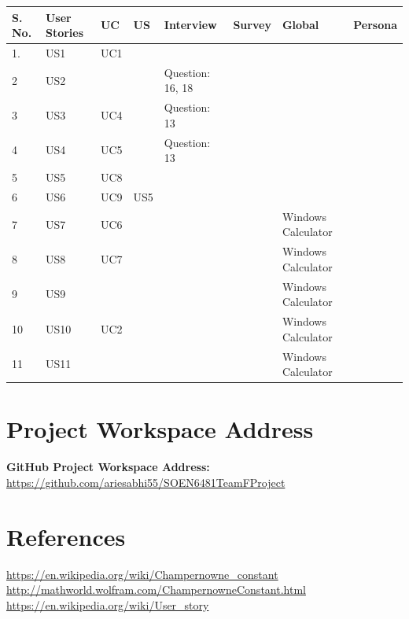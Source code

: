 \documentclass[paper=a4, fontsize=11pt]{report}
\numberwithin{equation}{section}		%
\numberwithin{figure}{section}			%
\numberwithin{table}{section}				%
\begin{document}
\begin{center}
\begin{tabular}{| m{.8cm} | m{1.8cm} | m{.8cm} | m{.8cm}| m{3cm} | m{1cm} | m{3cm} | m{1.5cm} |} 
\hline
S. No. & User Stories & UC & US & Interview & Survey & Global & Persona \\ [0.7ex]
\hline\hline
1. & US1 & UC1 &  &  &  &  & \\ 
\hline
2 & US2 &  &  & Question: 16, 18 &  &  &   \\ 
\hline
3 & US3 & UC4 &  & Question: 13 &  &  &  \\ 
\hline
4 & US4 & UC5 &  & Question: 13 &  &  &  \\ 
\hline
5 & US5 & UC8 &  &  &  &  &  \\ 
\hline
6 & US6 & UC9 & US5 &  &  &  &  \\ 
\hline
7 & US7 & UC6 &  &  &  & Windows Calculator &  \\ 
\hline
8 & US8 & UC7 &  &  &  & Windows Calculator & \\ 
\hline
9 & US9 &  &  &  &  & Windows Calculator &  \\ 
\hline
10 & US10 & UC2 &  &  &  & Windows Calculator &  \\ 
\hline
11 & US11 &  &  &  &  & Windows Calculator &  \\ 
\hline
\end{tabular}
\end{center}



\printglossary


\chapter{Project Workspace Address}
\textbf{GitHub Project Workspace Address:}
\url{https://github.com/ariesabhi55/SOEN6481TeamFProject} 

\chapter{References}

\url{https://en.wikipedia.org/wiki/Champernowne\_constant}
\vskip1mm
\url{http://mathworld.wolfram.com/ChampernowneConstant.html}
\vskip1mm
\url{https://en.wikipedia.org/wiki/User\_story}
\end{document}
